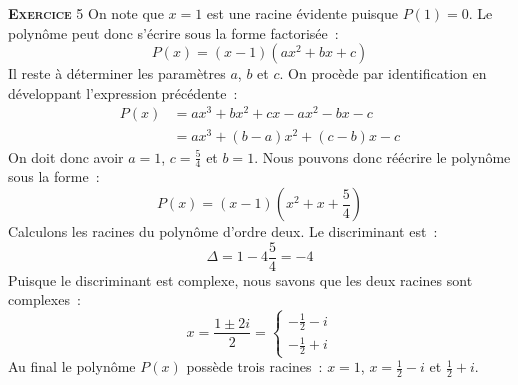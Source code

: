 \documentclass[10pt,a4paper,notitlepage]{article}
\newcommand{\exercice}[1]{\textsc{\textbf{Exercice}} #1}
\begin{document}
\exercice{5} On note que $x=1$ est une racine évidente puisque $P(1)=0$. Le polynôme peut donc s'écrire sous la forme factorisée :
\[
P(x) = (x-1)(ax^2+bx+c)
\]
Il reste à déterminer les paramètres $a$, $b$ et $c$. On procède par identification en développant l'expression précédente :
\[
  \begin{split}
    P(x) &= ax^3+bx^2+cx-ax^2-bx-c\\
    &= ax^3 +(b-a)x^2+(c-b)x-c
  \end{split}
\]
On doit donc avoir $a=1$, $c=\frac{5}{4}$ et $b=1$. Nous pouvons donc réécrire le polynôme sous la forme :
\[
P(x) = (x-1)(x^2+x+\frac{5}{4})
\]
Calculons les racines du polynôme d'ordre deux. Le discriminant est :
\[
\Delta = 1-4\frac{5}{4}=-4
\]
Puisque le discriminant est complexe, nous savons que les deux racines sont complexes :
\[
  x = \frac{1\pm 2i}{2} =
  \begin{cases}
    -\frac{1}{2}-i\\
    -\frac{1}{2}+i
  \end{cases}
\]
Au final le polynôme $P(x)$ possède trois racines : $x=1$, $x=\frac{1}{2}-i$ et $\frac{1}{2}+i$.

\bigskip
\end{document}
